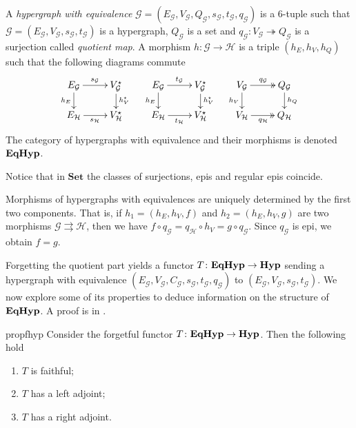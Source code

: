 \documentclass[3p]{elsarticle}
\newcommand{\Set}{\mathbf{Set}}
\newcommand{\catname}[1]{\textbf{\textup{#1}}}
\newcommand{\hyp}{\catname{Hyp}}
\newcommand{\EqHyp}{\catname{EqHyp}} %
\newcommand{\eto}{\twoheadrightarrow}
\theoremstyle{remark}
\theoremstyle{definition}
\begin{document}
\begin{defi}
	A \emph{hypergraph with equivalence} $\mathcal{G} = (E_\mathcal{G}, V_{\mathcal{G}}, Q_\mathcal{G}, s_\mathcal{G}, t_\mathcal{G}, q_\mathcal{G})$ is a 6-tuple such that $\mathcal{G} = (E_\mathcal{G}, V_{\mathcal{G}}, s_\mathcal{G}, t_\mathcal{G})$ is a hypergraph, $Q_\mathcal{G}$ is a set and $q_{\mathcal{G}}: V_{\mathcal{G}}\eto Q_{\mathcal{G}}$ is a surjection called \emph{quotient map}. 
	A morphism $h\colon \mathcal{G\to H}$ is a triple $(h_E, h_V, h_Q)$ such that the following diagrams commute
	\[\xymatrix@R=15pt{
		{E_\mathcal{G}}\ar[r]^{s_\mathcal{G}}\ar[d]_{h_E} & {V_{\mathcal{G}}^\star}\ar[d]^{h_V^\star} & {E_\mathcal{G}}\ar[r]^{t_\mathcal{G}}\ar[d]_{h_E} & {V_{\mathcal{G}}^\star}\ar[d]^{h_V^\star} & {V_\mathcal{G}}\ar@{>>}[r]^{q_\mathcal{G}}\ar[d]_{h_V} & {Q_{\mathcal{G}}} \ar[d]^{h_Q} \\
		{E_\mathcal{H}}\ar[r]_{s_\mathcal{H}} & {V_{\mathcal{H}}^\star}	& {E_\mathcal{H}}\ar[r]_{t_\mathcal{H}} & {V_{\mathcal{H}}^\star}& {V_\mathcal{H}}\ar@{>>}[r]_{q_\mathcal{H}} & {Q_\mathcal{H}}
	}\]
	The category of hypergraphs with equivalence and their morphisms is denoted $\EqHyp$.
	
\end{defi}

\begin{rem}
	Notice that in $\Set$ the classes of surjections, epis and regular epis coincide.
\end{rem}

\begin{rem}\label{rem:eqhyp_morphs}
	Morphisms of hypergraphs with equivalences are uniquely determined by the first two components. That is, if $h_1 = (h_E, h_V, f)$ and $h_2 = (h_E, h_V, g)$ are two morphisms $\mathcal{G} \rightrightarrows \mathcal{H}$, then we have
	$
	f \circ q_\mathcal{G} = q_\mathcal{H}\circ h_V =g\circ q_\mathcal{G}.
	$
	Since $q_\mathcal{G}$ is epi, we obtain $f = g$.
\end{rem}

Forgetting the quotient part yields a functor $T\colon \EqHyp \to \hyp$ sending a hypergraph with equivalence $(E_\mathcal{G}, V_{\mathcal{G}}, C_\mathcal{G}, s_\mathcal{G}, t_\mathcal{G}, q_\mathcal{G})$ to $(E_{\mathcal{G}}, V_{\mathcal{G}}, s_\mathcal{G}, t_{\mathcal{G}})$.   We now explore some of its properties to deduce information on the structure of $\EqHyp$.  
%
A proof is in .


\begin{restatable}{prop}{fhyp}\label{prop:forghyp}  Consider the forgetful functor $T\colon \EqHyp \to \hyp$. Then the following hold
	\begin{enumerate}
		\item$T$ is faithful;
		\item $T$ has a left adjoint;
		\item $T$ has a right adjoint.
	\end{enumerate}
\end{restatable}
\end{document}
